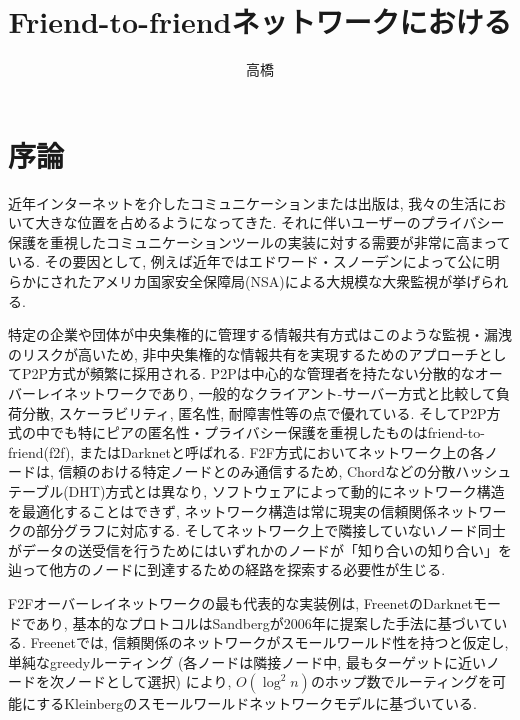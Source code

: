\documentclass[dvipdfmx]{ampbt}
\title{Friend-to-friendネットワークにおける} %
      {効率的な分散ルーティング}                         %
      {}                                         %
\author{高橋}{彰}             %
\begin{document}
\ifoutputbody
\makeinsidecover                %
\makeabstract                   %
\maketoc                        %
\setcounter{page}{1}            %
\section{序論}
近年インターネットを介したコミュニケーションまたは出版は, 我々の生活において大きな位置を占めるようになってきた. それに伴いユーザーのプライバシー保護を重視したコミュニケーションツールの実装に対する需要が非常に高まっている. その要因として, 例えば近年ではエドワード・スノーデンによって公に明らかにされたアメリカ国家安全保障局(NSA)による大規模な大衆監視が挙げられる.

特定の企業や団体が中央集権的に管理する情報共有方式はこのような監視・漏洩のリスクが高いため, 非中央集権的な情報共有を実現するためのアプローチとしてP2P方式が頻繁に採用される. P2Pは中心的な管理者を持たない分散的なオーバーレイネットワークであり, 一般的なクライアント-サーバー方式と比較して負荷分散, スケーラビリティ, 匿名性, 耐障害性等の点で優れている\cite{lua2005survey}. そしてP2P方式の中でも特にピアの匿名性・プライバシー保護を重視したものはfriend-to-friend(\acrshort{f2f})\cite{bricklin2000friend}, またはDarknet\cite{clarke2010private}と呼ばれる. F2F方式においてネットワーク上の各ノードは, 信頼のおける特定ノードとのみ通信するため, Chord\cite{stoica2001chord}などの分散ハッシュテーブル(DHT)方式とは異なり, ソフトウェアによって動的にネットワーク構造を最適化することはできず, ネットワーク構造は常に現実の信頼関係ネットワークの部分グラフに対応する. そしてネットワーク上で隣接していないノード同士がデータの送受信を行うためにはいずれかのノードが「知り合いの知り合い」を辿って他方のノードに到達するための経路を探索する必要性が生じる\cite{roos2016dealing}.

F2Fオーバーレイネットワークの最も代表的な実装例は, Freenet\cite{clarke2001freenet}のDarknetモード\cite{clarke2010private}であり, 基本的なプロトコルはSandberg\cite{sandberg2006distributed}が2006年に提案した手法に基づいている. Freenetでは, 信頼関係のネットワークがスモールワールド性を持つと仮定し, 単純なgreedyルーティング (各ノードは隣接ノード中, 最もターゲットに近いノードを次ノードとして選択) により, $O(\log^2 n)$のホップ数でルーティングを可能にするKleinbergのスモールワールドネットワークモデル\cite{kleinberg2000small}に基づいている.
\end{document}
